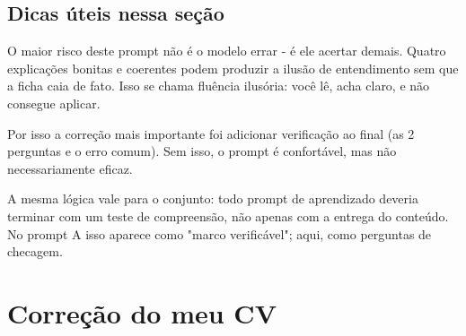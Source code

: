 \documentclass[11pt, a4paper]{article}
\begin{document}
\subsection*{Dicas úteis nessa seção}
O maior risco deste prompt não é o modelo errar - é ele acertar demais. Quatro explicações bonitas e coerentes podem produzir a ilusão de entendimento sem que a ficha caia de fato. Isso se chama fluência ilusória: você lê, acha claro, e não consegue aplicar.

Por isso a correção mais importante foi adicionar verificação ao final (as 2 perguntas e o erro comum). Sem isso, o prompt é confortável, mas não necessariamente eficaz.

A mesma lógica vale para o conjunto: todo prompt de aprendizado deveria terminar com um teste de compreensão, não apenas com a entrega do conteúdo. No prompt A isso aparece como "marco verificável"; aqui, como perguntas de checagem.

\section*{Correção do meu CV}
\end{document}
